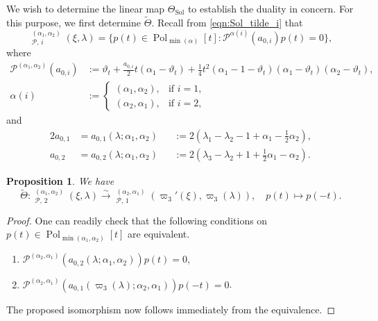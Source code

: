 \documentclass[a4paper,11pt,reqno]{amsart}
\newcommand{\calP}{\mathcal{P}}
\newcommand{\0}{{\bf 0}}
\newcommand{\1}{{\bf 1}}
\DeclareMathOperator{\Pol}{Pol}
\DeclareMathOperator{\Sol}{Sol}
\DeclareMathOperator{\To}{\longrightarrow}
\DeclareMathOperator{\wSol}{\widetilde{\Sol}}
\theoremstyle{plain}
\newtheorem{proposition}[equation]{Proposition}
\theoremstyle{definition}
\numberwithin{equation}{section}
\theoremstyle{definition}
\begin{document}
We wish to determine the linear map $\Theta_{\Sol}$ to establish
the duality in concern.
For this purpose, we first determine $\widetilde{\Theta}$.
Recall from \eqref{eqn:Sol_tilde_i} that 
\begin{equation*}
\wSol_{\calP,\, i}^{(\alpha_1,\alpha_2)}(\xi,\lambda) = \{p(t) \in \Pol_{\min(\alpha)}[t] : 
\calP^{\alpha(i)}(a_{0,i})p(t) = 0\},
\end{equation*}
where 
\begin{align*}
\calP^{(\alpha_1,\alpha_2)}(a_{0,i}) 
&:=\vartheta_t+\frac{a_{0,i}}{2}t(\alpha_1-\vartheta_t)
+\frac{1}{4}t^2(\alpha_1-1-\vartheta_t)(\alpha_1-\vartheta_t)(\alpha_2-\vartheta_t),\\[3pt]
\alpha(i)
&:=\begin{cases}
        (\alpha_1,\alpha_2), &\text{if $i=1$},\\
        (\alpha_2,\alpha_1), & \text{if $i=2$},
\end{cases}
\end{align*}
and
\begin{alignat*}{2}
a_{0,1}
&=a_{0,1}(\lambda;\alpha_1,\alpha_2)
&&:=2(\lambda_1-\lambda_2-1+\alpha_1-\tfrac{1}{2}\alpha_2),
\\
a_{0,2}
&=a_{0,2}(\lambda;\alpha_1,\alpha_2)
&&:= 2(\lambda_3-\lambda_2+1+\tfrac{1}{2}\alpha_1-\alpha_2).
\end{alignat*}

\begin{proposition}\label{prop:Sol12}
We have
\begin{equation}\label{eqn:wTheta}
\widetilde{\Theta}
\colon
\wSol_{\calP,\, 2}^{(\alpha_1,\alpha_2)}(\xi,\lambda) 
\stackrel{\sim}{\To}
\wSol_{\calP,\, 1}^{(\alpha_2, \alpha_1)}(\varpi_3'(\xi),\varpi_3(\lambda)),
\quad
p(t)\longmapsto p(-t).
\end{equation}
\end{proposition}

\begin{proof}
One can readily check that the following conditions on 
$p(t) \in \Pol_{\min(\alpha_1,\alpha_2)}[t]$ are equivalent.
\begin{enumerate}[label=\normalfont{(\roman*)}]
\item $\calP^{(\alpha_2,\alpha_1)}(a_{0,2}(\lambda;\alpha_1,\alpha_2))p(t) = 0$,
\vspace{3pt}
\item $\calP^{(\alpha_2,\alpha_1)}(a_{0,1}(\varpi_3(\lambda);\alpha_2,\alpha_1))p(-t) = 0$.
\end{enumerate}
The proposed isomorphism
now follows immediately from the equivalence.
\end{proof}
\end{document}
